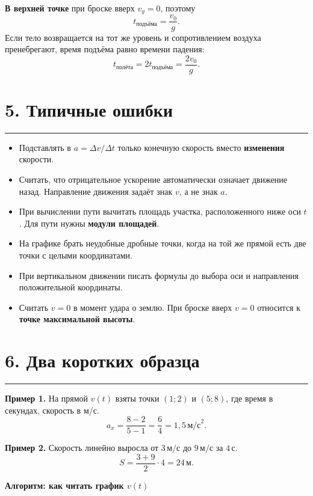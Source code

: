 \documentclass[a4paper,12pt]{article}
\newcommand{\sectionrule}{\par\vspace{0.25em}\noindent\color{accent}\rule{\linewidth}{0.55pt}\color{textgray}\par\vspace{0.25em}}
\newcommand{\key}[1]{\textbf{\color{darkaccent}#1}}
\newcommand{\ms}{\,\text{м/с}}
\newcommand{\mss}{\,\text{м/с}^2}
\newcommand{\metr}{\,\text{м}}
\newcommand{\secnd}{\,\text{с}}
\begin{document}
\key{В верхней точке} при броске вверх $v_y=0$, поэтому
\[
 t_{\text{подъёма}}=\frac{v_0}{g}.
\]
Если тело возвращается на тот же уровень и сопротивлением воздуха пренебрегают, время подъёма равно времени падения:
\[
 t_{\text{полёта}}=2t_{\text{подъёма}}=\frac{2v_0}{g}.
\]

\section*{5. Типичные ошибки}
\sectionrule
\begin{itemize}
  \item Подставлять в $a=\Delta v/\Delta t$ только конечную скорость вместо \key{изменения} скорости.
  \item Считать, что отрицательное ускорение автоматически означает движение назад. Направление движения задаёт знак $v$, а не знак $a$.
  \item При вычислении пути вычитать площадь участка, расположенного ниже оси $t$. Для пути нужны \key{модули площадей}.
  \item На графике брать неудобные дробные точки, когда на той же прямой есть две точки с целыми координатами.
  \item При вертикальном движении писать формулы до выбора оси и направления положительной координаты.
  \item Считать $v=0$ в момент удара о землю. При броске вверх $v=0$ относится к \key{точке максимальной высоты}.
\end{itemize}

\section*{6. Два коротких образца}
\sectionrule

\key{Пример 1.} На прямой $v(t)$ взяты точки $(1;2)$ и $(5;8)$, где время в секундах, скорость в м/с.
\[
a_x=\frac{8-2}{5-1}=\frac{6}{4}=1{,}5\mss.
\]

\key{Пример 2.} Скорость линейно выросла от $3\ms$ до $9\ms$ за $4\secnd$.
\[
S=\frac{3+9}{2}\cdot 4=24\metr.
\]

\clearpage
\thispagestyle{plain}
\begin{center}
{\LARGE\bfseries\color{darkaccent}Алгоритм: как читать график $v(t)$}
\end{center}
\vspace{8mm}
\end{document}
